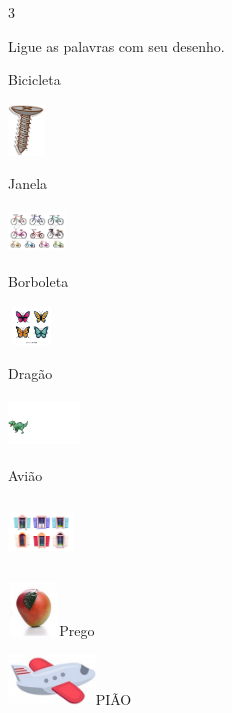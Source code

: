 {{\num{3}

Ligue as palavras com seu desenho.


Bicicleta

\includegraphics[width=0.38403in,height=0.53889in]{media/image59.png}

Janela

\includegraphics[width=0.60069in,height=0.48056in]{media/image60.png}

Borboleta

\includegraphics[width=0.49028in,height=0.40833in]{media/image61.png}

Dragão

\includegraphics[width=0.74931in,height=0.52292in]{media/image62.png}

Avião

\includegraphics[width=0.68542in,height=0.66319in]{media/image63.png}

\includegraphics[width=0.53403in,height=0.56667in]{media/image64.jpeg}Prego

\includegraphics[width=0.91319in,height=0.52292in]{media/image65.png}PIÃO

}}

